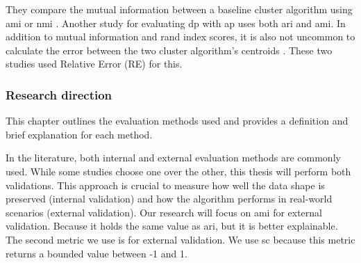 They compare the mutual information between a baseline cluster algorithm using \gls{ami} \citep{9679364} or \gls{nmi} \citep{xia_distributed_2020,sun_privbv_2022}.
Another study for evaluating \gls{dp} with \gls{ap} uses both \gls{ari} and \gls{ami}.
In addition to mutual information and rand index scores, it is also not uncommon to calculate the error between the two cluster algorithm's centroids \citep{xia_distributed_2020, 9679364}.
These two studies used Relative Error (RE) for this.

\subsubsection{Research direction}
This chapter outlines the evaluation methods used and provides a definition and brief explanation for each method.

In the literature, both internal and external evaluation methods are commonly used.
While some studies choose one over the other, this thesis will perform both validations.
This approach is crucial to measure how well the data shape is preserved (internal validation) and how the algorithm performs in real-world scenarios (external validation).
Our research will focus on \gls{ami} for external validation. Because it holds the same value as \gls{ari}, but it is better explainable.
The second metric we use is for external validation. We use \gls{sc} because this metric returns a bounded value between -1 and 1.

